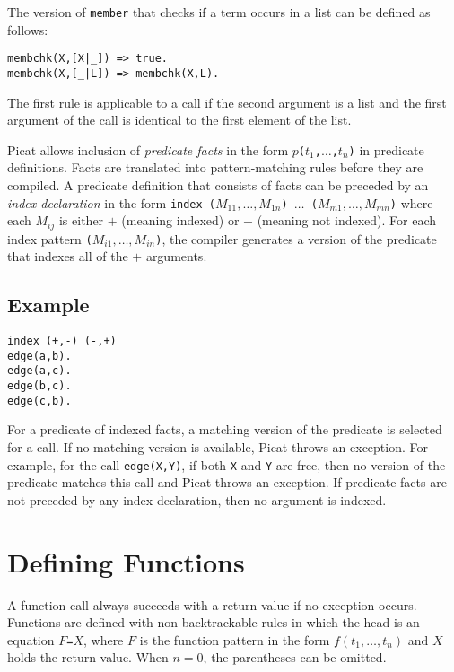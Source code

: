 The version of \texttt{member} that checks if a term occurs in a list can be defined as follows:
\begin{verbatim}
membchk(X,[X|_]) => true.
membchk(X,[_|L]) => membchk(X,L).
\end{verbatim}
The first rule is applicable to a call if the second argument is a list and the first argument of the call is identical to the first element of the list.

Picat allows inclusion of \emph{predicate facts} in the form \texttt{$p$($t_1$,$\ldots$,$t_n$)} in predicate definitions. Facts are translated into pattern-matching rules before they are compiled. A predicate definition that consists of facts can be preceded by an \emph{index declaration} in the form \texttt{index ($M_{11},\ldots,M_{1n}$) $\ldots$ ($M_{m1},\ldots,M_{mn}$)} where each $M_{ij}$ is either $+$ (meaning indexed) or $-$ (meaning not indexed). For each index pattern \texttt{($M_{i1},\ldots,M_{in}$)}, the compiler generates a version of the predicate that indexes all of the $+$ arguments. 

\subsection*{Example}
\begin{verbatim}
index (+,-) (-,+)
edge(a,b).
edge(a,c).
edge(b,c).
edge(c,b).
\end{verbatim}
For a predicate of indexed facts, a matching version of the predicate is selected for a call. If no matching version is available, Picat throws an exception. For example, for the call \texttt{edge(X,Y)}, if both \texttt{X} and \texttt{Y} are free, then no version of the predicate matches this call and Picat throws an exception. If predicate facts are not preceded by any index declaration, then no argument is indexed.

\section{Defining Functions}
A function call always succeeds with a return value if no exception occurs. Functions are defined with non-backtrackable rules in which the head is an equation $F$\verb+=+$X$, where $F$ is the function pattern in the form $f(t_1,\ldots, t_n)$ and $X$ holds the return value. When $n=0$, the parentheses can be omitted.

